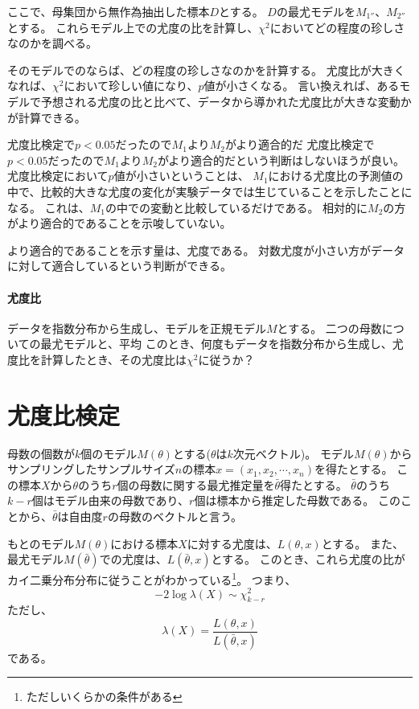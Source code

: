 ここで、母集団から無作為抽出した標本$D$とする。
$D$の最尤モデルを$M_{1''}$、$M_{2''}$とする。
これらモデル上での尤度の比を計算し、$\chi^2$においてどの程度の珍しさなのかを調べる。


そのモデルでのならば、どの程度の珍しさなのかを計算する。
尤度比が大きくなれば、$\chi^2$において珍しい値になり、$p$値が小さくなる。
言い換えれば、あるモデルで予想される尤度の比と比べて、データから導かれた尤度比が大きな変動かが計算できる。
\fi

\begin{SMbox}{尤度比検定で$p<0.05$だったので$M_1$より$M_2$がより適合的だ}
    尤度比検定で$p<0.05$だったので$M_1$より$M_2$がより適合的だという判断はしないほうが良い。
    尤度比検定において$p$値が小さいということは、
    $M_1$における尤度比の予測値の中で、比較的大きな尤度の変化が実験データでは生じていることを示したことになる。
    これは、$M_1$の中での変動と比較しているだけである。
    相対的に$M_2$の方がより適合的であることを示唆していない。
    
    より適合的であることを示す量は、尤度である。
    対数尤度が小さい方がデータに対して適合しているという判断ができる。
\end{SMbox}



\paragraph{尤度比}
データを指数分布から生成し、モデルを正規モデル$M$とする。
二つの母数についての最尤モデルと、平均
このとき、何度もデータを指数分布から生成し、尤度比を計算したとき、その尤度比は$\chi^2$に従うか？
\fi

\section{尤度比検定}
母数の個数が$k$個のモデル$M(\theta)$とする($\theta$は$k$次元ベクトル)。
モデル$M(\theta)$からサンプリングしたサンプルサイズ$n$の標本$x=(x_1,x_2,\cdots,x_n)$を得たとする。
この標本$X$から$\theta$のうち$r$個の母数に関する最尤推定量を$\bar{\theta}$得たとする。
$\bar{\theta}$のうち$k-r$個はモデル由来の母数であり、$r$個は標本から推定した母数である。
このことから、$\bar{\theta}$は自由度$r$の母数のベクトルと言う。

もとのモデル$M(\theta)$における標本$X$に対する尤度は、$L(\theta,x)$とする。
また、最尤モデル$M(\bar{\theta})$での尤度は、$L(\bar{\theta},x)$とする。
このとき、これら尤度の比がカイ二乗分布分布に従うことがわかっている\footnote{ただしいくらかの条件がある}。
つまり、
\begin{equation*}
    -2\log\lambda(X)\sim \chi^2_{k-r}
\end{equation*}
ただし、
\begin{equation*}
    \lambda(X) = \frac{L(\theta,x)}{L(\bar{\theta},x)} 
\end{equation*}
である。


